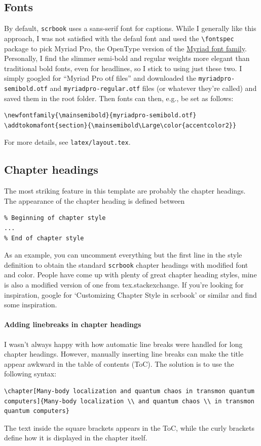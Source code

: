 \subsection{Fonts}
By default, \verb|scrbook| uses a sans-serif font for captions. While I generally like this approach, I was not satisfied with the defaul font and used the \verb|\fontspec| package to pick Myriad Pro, the OpenType version of the \href{https://en.wikipedia.org/wiki/Myriad_(typeface)}{Myriad font family}.
Personally, I find the slimmer semi-bold and regular weights more elegant than traditional bold fonts, even for headlines, so I stick to using just these two. I simply googled for ``Myriad Pro otf files'' and downloaded the \verb|myriadpro-semibold.otf| and \verb|myriadpro-regular.otf| files (or whatever they're called) and saved them in the root folder. Then fonts can then, e.g., be set as follows:
\begin{lstlisting}
\newfontfamily{\mainsemibold}{myriadpro-semibold.otf}
\addtokomafont{section}{\mainsemibold\Large\color{accentcolor2}}
\end{lstlisting}
For more details, see \verb|latex/layout.tex|.

\subsection{Chapter headings}
The most striking feature in this template are probably the chapter headings.
The appearance of the chapter heading is defined between
\begin{lstlisting}
% Beginning of chapter style
...
% End of chapter style
\end{lstlisting}
As an example, you can uncomment everything but the first line in the style definition to obtain the standard \verb|scrbook| chapter headings with modified font and color. 
People have come up with plenty of great chapter heading styles, mine is also a modified version of one from tex.stackexchange. If you’re looking for inspiration, google for `Customizing Chapter Style in scrbook' or similar and find some inspiration.

\paragraph{Adding linebreaks in chapter headings}
I wasn’t always happy with how automatic line breaks were handled for long chapter headings. However, manually inserting line breaks can make the title appear awkward in the table of contents (ToC). The solution is to use the following syntax:
\begin{lstlisting}
\chapter[Many-body localization and quantum chaos in transmon quantum computers]{Many-body localization \\ and quantum chaos \\ in transmon quantum computers}
\end{lstlisting}
The text inside the square brackets appears in the ToC, while the curly brackets define how it is displayed in the chapter itself.

